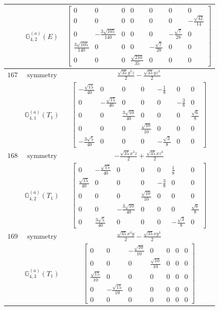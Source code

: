\documentclass[fleqn,8pt,landscape]{jsarticle}
\begin{document}
\begin{longtable}{ccc}
$  $ & $ \mathbb{G}_{4,2}^{(a)}(E) $ & $ \begin{bmatrix} 0 & 0 & 0 & 0 & 0 & 0 & 0 \\ 0 & 0 & 0 & 0 & 0 & 0 & - \frac{\sqrt{42}}{14} \\ 0 & - \frac{3 \sqrt{105}}{140} & 0 & 0 & 0 & - \frac{\sqrt{7}}{28} & 0 \\ \frac{3 \sqrt{105}}{140} & 0 & 0 & 0 & - \frac{\sqrt{7}}{28} & 0 & 0 \\ 0 & 0 & 0 & \frac{\sqrt{210}}{35} & 0 & 0 & 0 \end{bmatrix} $ \\ \hline
$ 167 $ & $ \text{symmetry} $ & $ \frac{\sqrt{35} y^{3} z}{2} - \frac{\sqrt{35} y z^{3}}{2} $ \\
$  $ & $ \mathbb{G}_{4,1}^{(a)}(T_{1}) $ & $ \begin{bmatrix} - \frac{\sqrt{15}}{40} & 0 & 0 & 0 & - \frac{1}{8} & 0 & 0 \\ 0 & - \frac{\sqrt{15}}{40} & 0 & 0 & 0 & - \frac{3}{8} & 0 \\ 0 & 0 & \frac{3 \sqrt{10}}{40} & 0 & 0 & 0 & \frac{\sqrt{6}}{8} \\ 0 & 0 & 0 & \frac{\sqrt{10}}{10} & 0 & 0 & 0 \\ - \frac{3 \sqrt{5}}{40} & 0 & 0 & 0 & - \frac{\sqrt{3}}{8} & 0 & 0 \end{bmatrix} $ \\ \hline
$ 168 $ & $ \text{symmetry} $ & $ - \frac{\sqrt{35} x^{3} z}{2} + \frac{\sqrt{35} x z^{3}}{2} $ \\
$  $ & $ \mathbb{G}_{4,2}^{(a)}(T_{1}) $ & $ \begin{bmatrix} 0 & - \frac{\sqrt{15}}{40} & 0 & 0 & 0 & \frac{1}{8} & 0 \\ \frac{\sqrt{15}}{40} & 0 & 0 & 0 & - \frac{3}{8} & 0 & 0 \\ 0 & 0 & 0 & \frac{\sqrt{10}}{10} & 0 & 0 & 0 \\ 0 & 0 & - \frac{3 \sqrt{10}}{40} & 0 & 0 & 0 & \frac{\sqrt{6}}{8} \\ 0 & \frac{3 \sqrt{5}}{40} & 0 & 0 & 0 & - \frac{\sqrt{3}}{8} & 0 \end{bmatrix} $ \\ \hline
$ 169 $ & $ \text{symmetry} $ & $ \frac{\sqrt{35} x^{3} y}{2} - \frac{\sqrt{35} x y^{3}}{2} $ \\
$  $ & $ \mathbb{G}_{4,3}^{(a)}(T_{1}) $ & $ \begin{bmatrix} 0 & 0 & - \frac{\sqrt{10}}{10} & 0 & 0 & 0 & 0 \\ 0 & 0 & 0 & \frac{\sqrt{10}}{10} & 0 & 0 & 0 \\ \frac{\sqrt{15}}{10} & 0 & 0 & 0 & 0 & 0 & 0 \\ 0 & - \frac{\sqrt{15}}{10} & 0 & 0 & 0 & 0 & 0 \\ 0 & 0 & 0 & 0 & 0 & 0 & 0 \end{bmatrix} $ \\ \hline

\end{longtable}
\end{document}
